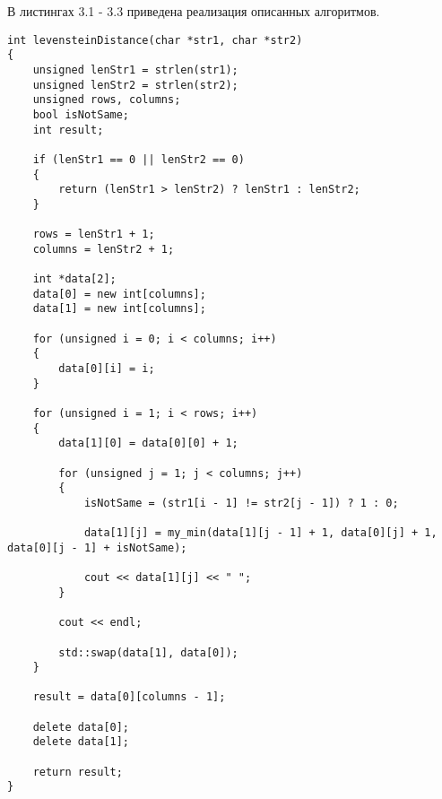 В листингах 3.1 - 3.3 приведена реализация описанных алгоритмов.
\begin{lstlisting}[caption=Расстояние Левенштейна (матричная реализация)]
int levensteinDistance(char *str1, char *str2)
{
    unsigned lenStr1 = strlen(str1);
    unsigned lenStr2 = strlen(str2);
    unsigned rows, columns;
    bool isNotSame;
    int result;

    if (lenStr1 == 0 || lenStr2 == 0)
    {
        return (lenStr1 > lenStr2) ? lenStr1 : lenStr2;
    }

    rows = lenStr1 + 1;
    columns = lenStr2 + 1;

    int *data[2];
    data[0] = new int[columns];
    data[1] = new int[columns];

    for (unsigned i = 0; i < columns; i++)
    {
        data[0][i] = i;
    }

    for (unsigned i = 1; i < rows; i++)
    {
        data[1][0] = data[0][0] + 1;

        for (unsigned j = 1; j < columns; j++)
        {
            isNotSame = (str1[i - 1] != str2[j - 1]) ? 1 : 0;

            data[1][j] = my_min(data[1][j - 1] + 1, data[0][j] + 1, data[0][j - 1] + isNotSame);

            cout << data[1][j] << " ";
        }

        cout << endl;

        std::swap(data[1], data[0]);
    }

    result = data[0][columns - 1];

    delete data[0];
    delete data[1];

    return result;
}
\end{lstlisting}

